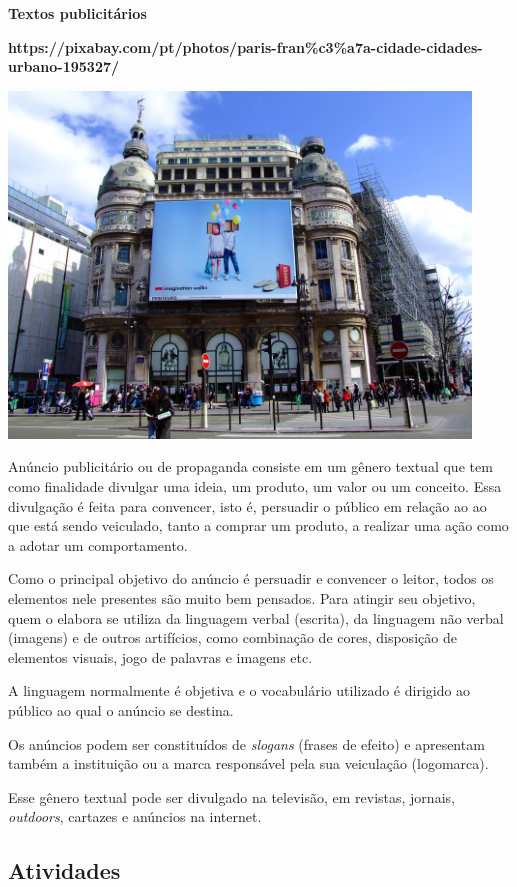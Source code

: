 \textbf{Textos publicitários}

\textbf{https://pixabay.com/pt/photos/paris-fran\%c3\%a7a-cidade-cidades-urbano-195327/}

\includegraphics[width=4.83333in,height=3.62500in]{media/image8.jpeg}

Anúncio publicitário ou de propaganda consiste em um gênero textual que
tem como finalidade divulgar uma ideia, um produto, um valor ou um
conceito. Essa divulgação é feita para convencer, isto é, persuadir o
público em relação ao ao que está sendo veiculado, tanto a comprar um
produto, a realizar uma ação como a adotar um comportamento.

Como o principal objetivo do anúncio é persuadir e convencer o leitor,
todos os elementos nele presentes são muito bem pensados. Para atingir
seu objetivo, quem o elabora se utiliza da linguagem verbal (escrita),
da linguagem não verbal (imagens) e de outros artifícios, como
combinação de cores, disposição de elementos visuais, jogo de palavras e
imagens etc.

A linguagem normalmente é objetiva e o vocabulário utilizado é dirigido
ao público ao qual o anúncio se destina.

Os anúncios podem ser constituídos de \emph{slogans} (frases de efeito)
e apresentam também a instituição ou a marca responsável pela sua
veiculação (logomarca).

Esse gênero textual pode ser divulgado na televisão, em revistas,
jornais, \emph{outdoors}, cartazes e anúncios na internet.

\subsection{Atividades}\label{atividades-3}

